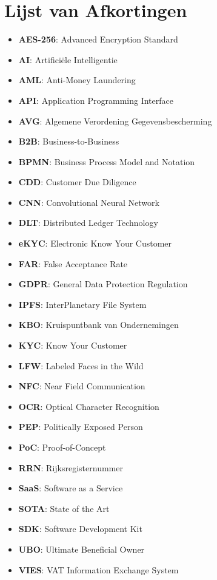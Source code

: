 \chapter*{Lijst van Afkortingen}

\begin{itemize}
    \item \textbf{AES-256}: Advanced Encryption Standard
    \item \textbf{AI}: Artificiële Intelligentie
    \item \textbf{AML}: Anti-Money Laundering
    \item \textbf{API}: Application Programming Interface
    \item \textbf{AVG}: Algemene Verordening Gegevensbescherming
    \item \textbf{B2B}: Business-to-Business
    \item \textbf{BPMN}: Business Process Model and Notation
    \item \textbf{CDD}: Customer Due Diligence
    \item \textbf{CNN}: Convolutional Neural Network
    \item \textbf{DLT}: Distributed Ledger Technology
    \item \textbf{eKYC}: Electronic Know Your Customer
    \item \textbf{FAR}: False Acceptance Rate
    \item \textbf{GDPR}: General Data Protection Regulation
    \item \textbf{IPFS}: InterPlanetary File System
    \item \textbf{KBO}: Kruispuntbank van Ondernemingen
    \item \textbf{KYC}: Know Your Customer
    \item \textbf{LFW}: Labeled Faces in the Wild
    \item \textbf{NFC}: Near Field Communication
    \item \textbf{OCR}: Optical Character Recognition
    \item \textbf{PEP}: Politically Exposed Person
    \item \textbf{PoC}: Proof-of-Concept
    \item \textbf{RRN}: Rijksregisternummer
    \item \textbf{SaaS}: Software as a Service
    \item \textbf{SOTA}: State of the Art
    \item \textbf{SDK}: Software Development Kit
    \item \textbf{UBO}: Ultimate Beneficial Owner
    \item \textbf{VIES}: VAT Information Exchange System
\end{itemize}

\newpage